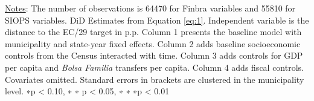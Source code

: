 \begin{table}[h!]
\begin{footnotesize}
\begin{center}
{\begin{threeparttable}[b]
    
  \label{table:fiscal}%
  
  \begin{tablenotes}
  \scriptsize{\underline{Notes}: The number of observations is 64470 for Finbra variables and 55810 for SIOPS variables.  DiD Estimates from Equation \ref{eq:1}. Independent variable is the distance to the EC/29 target in p.p. Column 1 presents the baseline model with municipality and state-year fixed effects. Column 2 adds baseline socioeconomic controls from the Census interacted with time. Column 3 adds controls for GDP per capita and \emph{Bolsa Familia} transfers per capita. Column 4 adds fiscal controls. Covariates omitted. Standard errors in brackets are clustered in the municipality level. ∗p < 0.10, ∗ ∗ p < 0.05, ∗ ∗ ∗p < 0.01}
  \end{tablenotes}

\end{threeparttable}
}
\end{center}
\end{footnotesize}
\end{table}